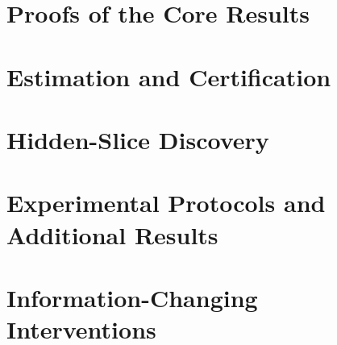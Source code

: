 \documentclass{article}
\begin{document}
\clearpage
\appendix
\raggedbottom
\makeatletter
\setlength{\@fptop}{0pt}
\makeatother
{}
\renewcommand{\theHfigure}{supp.\thesection.\arabic{figure}}
\renewcommand{\theHtable}{supp.\thesection.\arabic{table}}

\section{Proofs of the Core Results}
\label{app:core-proofs}


\section{Estimation and Certification}
\label{app:estimation-certification}

\FloatBarrier

\section{Hidden-Slice Discovery}
\label{app:hidden-slice-discovery}

\FloatBarrier

\clearpage
\section{Experimental Protocols and Additional Results}
\label{app:experimental-details}


\FloatBarrier

\clearpage
\section{Information-Changing Interventions}
\label{app:information-interventions}


\FloatBarrier

\clearpage

\begingroup
{}

\endgroup
\end{document}
